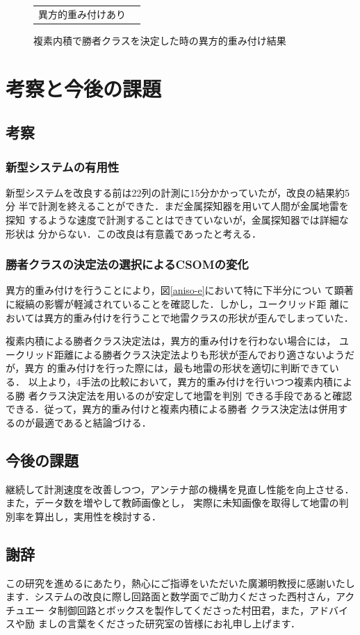 ﻿\documentclass[12pt,oneside]{jsbook}
\begin{document}
\begin{figure}[btp]
\begin{center}
\begin{tabular}{cc}
\begin{minipage}{0.5\hsize}
\centering\textmd{異方的重み付けあり}
   \end{minipage}
\end{tabular}
\caption{複素内積で勝者クラスを決定した時の異方的重み付け結果}
\label{aniso-i}
 \end{center}
\end{figure}
\newpage
\chapter{考察と今後の課題}
\section{考察}
\subsection{新型システムの有用性}
新型システムを改良する前は22列の計測に15分かかっていたが，改良の結果約5分
半で計測を終えることができた．まだ金属探知器を用いて人間が金属地雷を探知
するような速度で計測することはできていないが，金属探知器では詳細な形状は
分からない．この改良は有意義であったと考える．
\subsection{勝者クラスの決定法の選択によるCSOMの変化}
異方的重み付けを行うことにより，図\ref{aniso-e}において特に下半分につい
て顕著に縦縞の影響が軽減されていることを確認した．しかし，ユークリッド距
離においては異方的重み付けを行うことで地雷クラスの形状が歪んでしまっていた．

複素内積による勝者クラス決定法は，異方的重み付けを行わない場合には，
ユークリッド距離による勝者クラス決定法よりも形状が歪んでおり適さないようだが，異方
的重み付けを行った際には，最も地雷の形状を適切に判断できている．
以上より，4手法の比較において，異方的重み付けを行いつつ複素内積による勝
者クラス決定法を用いるのが安定して地雷を判別
できる手段であると確認できる．従って，異方的重み付けと複素内積による勝者
クラス決定法は併用するのが最適であると結論づける．
\section{今後の課題}
継続して計測速度を改善しつつ，アンテナ部の機構を見直し性能を向上させる．
また，データ数を増やして教師画像とし，
実際に未知画像を取得して地雷の判別率を算出し，実用性を検討する．
\section*{謝辞}
この研究を進めるにあたり，熱心にご指導をいただいた廣瀬明教授に感謝いたし
ます．システムの改良に際し回路面と数学面でご助力くださった西村さん，アクチュエー
タ制御回路とボックスを製作してくださった村田君，また，アドバイスや励
ましの言葉をくださった研究室の皆様にお礼申し上げます．
\end{document}
